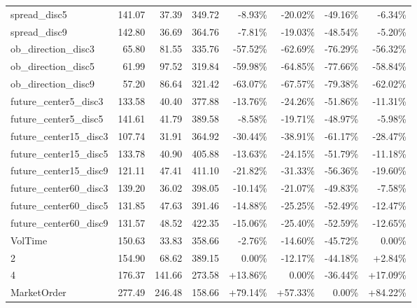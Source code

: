 \begin{table}[ht]
{\begin{tabular}{lRRR|RRRR}
spread\_disc5                 &    141.07 &   37.39 &  349.72 &   -8.93\% &  -20.02\% &  -49.16\% &       -6.34\% \\
spread\_disc9                 &    142.80 &   36.69 &  364.76 &   -7.81\% &  -19.03\% &  -48.54\% &       -5.20\% \\
\midrule
ob\_direction\_disc3           &     65.80 &   81.55 &  335.76 &  -57.52\% &  -62.69\% &  -76.29\% &      -56.32\% \\
ob\_direction\_disc5           &     61.99 &   97.52 &  319.84 &  -59.98\% &  -64.85\% &  -77.66\% &      -58.84\% \\
ob\_direction\_disc9           &     57.20 &   86.64 &  321.42 &  -63.07\% &  -67.57\% &  -79.38\% &      -62.02\% \\
future\_center5\_disc3         &    133.58 &   40.40 &  377.88 &  -13.76\% &  -24.26\% &  -51.86\% &      -11.31\% \\
future\_center5\_disc5         &    141.61 &   41.79 &  389.58 &   -8.58\% &  -19.71\% &  -48.97\% &       -5.98\% \\
future\_center15\_disc3        &    107.74 &   31.91 &  364.92 &  -30.44\% &  -38.91\% &  -61.17\% &      -28.47\% \\
future\_center15\_disc5        &    133.78 &   40.90 &  405.88 &  -13.63\% &  -24.15\% &  -51.79\% &      -11.18\% \\
future\_center15\_disc9        &    121.11 &   47.41 &  411.10 &  -21.82\% &  -31.33\% &  -56.36\% &      -19.60\% \\
future\_center60\_disc3        &    139.20 &   36.02 &  398.05 &  -10.14\% &  -21.07\% &  -49.83\% &       -7.58\% \\
future\_center60\_disc5        &    131.85 &   47.63 &  391.46 &  -14.88\% &  -25.25\% &  -52.49\% &      -12.47\% \\
future\_center60\_disc9        &    131.57 &   48.52 &  422.35 &  -15.06\% &  -25.40\% &  -52.59\% &      -12.65\% \\
\midrule
VolTime                      &    150.63 &   33.83 &  358.66 &   -2.76\% &  -14.60\% &  -45.72\% &        0.00\% \\
2                            &    154.90 &   68.62 &  389.15 &    0.00\% &  -12.17\% &  -44.18\% &        +2.84\% \\
4                            &    176.37 &  141.66 &  273.58 &   +13.86\% &    0.00\% &  -36.44\% &       +17.09\% \\
MarketOrder                  &    277.49 &  246.48 &  158.66 &   +79.14\% &   +57.33\% &    0.00\% &       +84.22\% \\
\bottomrule
\end{tabular}
}


\end{table}
